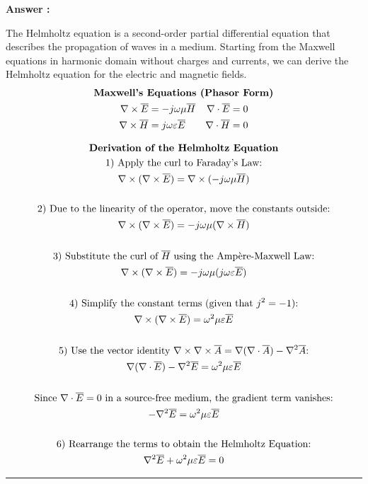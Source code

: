 \documentclass[a4paper,11pt]{book}
\newcounter{qacount}
\newenvironment{answer}{
  \noindent\textbf{Answer \theqacount:}\space
}{
  \par\vspace{1em}   %
  \hrule             %
  \vspace{0.5em}     %
}
\begin{document}
\begin{answer}
    The Helmholtz equation is a second-order partial differential equation that describes the propagation of waves in a medium.
    Starting from the Maxwell equations in harmonic domain without charges and currents, we can derive the Helmholtz equation for the electric and magnetic fields.
    \begin{gather*}
        \text{\textbf{Maxwell's Equations (Phasor Form)}} \\
        \begin{aligned}
            \nabla \times \overline{E} & = -j\omega\mu \overline{H}        & \nabla \cdot \overline{E} & = 0 \\
            \nabla \times \overline{H} & = j\omega\varepsilon \overline{E} & \nabla \cdot \overline{H} & = 0
        \end{aligned}
    \end{gather*}

    \begin{gather*}
        \text{\textbf{Derivation of the Helmholtz Equation}} \\
        \text{1) Apply the curl to Faraday's Law:} \\
        \nabla \times (\nabla \times \overline{E}) = \nabla \times (-j\omega\mu \overline{H}) \\
        \\
        \text{2) Due to the linearity of the operator, move the constants outside:} \\
        \nabla \times (\nabla \times \overline{E}) = -j\omega\mu (\nabla \times \overline{H}) \\
        \\
        \text{3) Substitute the curl of } \overline{H} \text{ using the Ampère-Maxwell Law:} \\
        \nabla \times (\nabla \times \overline{E}) = -j\omega\mu (j\omega\varepsilon \overline{E}) \\
        \\
        \text{4) Simplify the constant terms (given that } j^2 = -1\text{):} \\
        \nabla \times (\nabla \times \overline{E}) = \omega^2\mu\varepsilon \overline{E} \\
        \\
        \text{5) Use the vector identity } \nabla \times \nabla \times \overline{A} = \nabla(\nabla \cdot \overline{A}) - \nabla^2\overline{A} \text{:} \\
        \nabla(\nabla \cdot \overline{E}) - \nabla^2\overline{E} = \omega^2\mu\varepsilon \overline{E} \\
        \\
        \text{Since } \nabla \cdot \overline{E} = 0 \text{ in a source-free medium, the gradient term vanishes:} \\
        -\nabla^2\overline{E} = \omega^2\mu\varepsilon \overline{E} \\
        \\
        \text{6) Rearrange the terms to obtain the Helmholtz Equation:} \\
        \nabla^2\overline{E} + \omega^2\mu\varepsilon \overline{E} = 0
    \end{gather*}


\end{answer}
\end{document}
